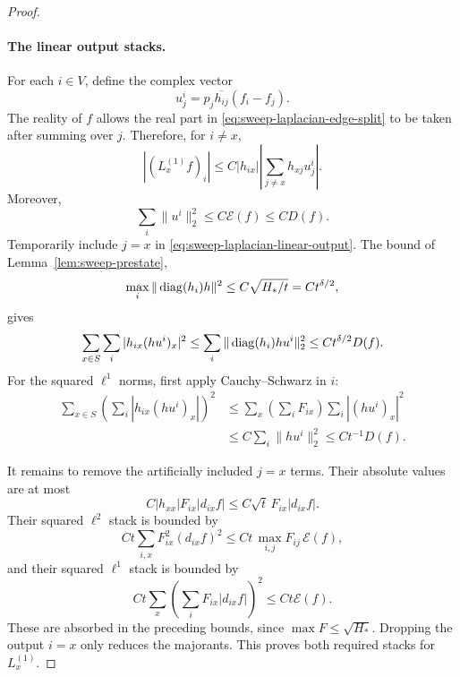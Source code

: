 \begin{proof}
\paragraph{The linear output stacks.}
For each \(i\in V\), define the complex vector
\[
 u^i_j=p_j\overline{h_{ij}}(f_i-f_j).
\]
The reality of \(f\) allows the real part in
\eqref{eq:sweep-laplacian-edge-split} to be taken after summing over
\(j\).  Therefore, for \(i\ne x\),
\begin{equation}\label{eq:sweep-laplacian-linear-output}
 |(L_x^{(1)}f)_i|
 \le C|h_{ix}|
       \left|\sum_{j\ne x}h_{xj}u^i_j\right|.
\end{equation}
Moreover,
\[
 \sum_i\|u^i\|_2^2\le C\mathcal E(f)\le CD(f).
\]
Temporarily include \(j=x\) in
\eqref{eq:sweep-laplacian-linear-output}.
The bound of Lemma~\ref{lem:sweep-prestate},
\[
 \max_i\|\operatorname{diag}(h_i)h\|^2
 \le C\sqrt{H_*/t}=Ct^{\delta/2},
\]
gives
\begin{equation}\label{eq:sweep-laplacian-linear-two}
 \sum_{x\in S}\sum_i|h_{ix}(hu^i)_x|^2
 \le\sum_i\|\operatorname{diag}(h_i)hu^i\|_2^2
 \le Ct^{\delta/2}D(f).
\end{equation}
For the squared \(\ell^1\) norms, first apply Cauchy--Schwarz in \(i\):
\begin{align*}
 \sum_{x\in S}\left(\sum_i|h_{ix}(hu^i)_x|\right)^2
 &\le
 \sum_x\left(\sum_iF_{ix}\right)\sum_i|(hu^i)_x|^2\\
 &\le C\sum_i\|hu^i\|_2^2
 \le Ct^{-1}D(f).
\end{align*}

It remains to remove the artificially included \(j=x\) terms.
Their absolute values are at most
\[
 C|h_{xx}|F_{ix}|d_{ix}f|
 \le C\sqrt t\,F_{ix}|d_{ix}f|.
\]
Their squared \(\ell^2\) stack is bounded by
\[
 Ct\sum_{i,x}F_{ix}^2(d_{ix}f)^2
 \le Ct\,\max_{i,j}F_{ij}\,\mathcal E(f),
\]
and their squared \(\ell^1\) stack is bounded by
\[
 Ct\sum_x\left(\sum_iF_{ix}|d_{ix}f|\right)^2
 \le Ct\mathcal E(f).
\]
These are absorbed in the preceding bounds, since
\(\max F\le\sqrt{H_*}\).  Dropping the output \(i=x\) only reduces the
majorants.  This proves both required stacks for \(L_x^{(1)}\).


\end{proof}
